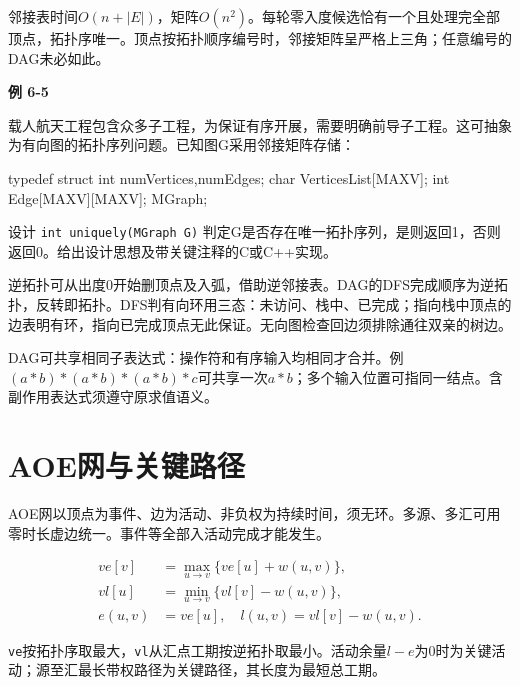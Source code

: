 邻接表时间\(O(n+|E|)\)，矩阵\(O(n^2)\)。每轮零入度候选恰有一个且处理完全部顶点，拓扑序唯一。顶点按拓扑顺序编号时，邻接矩阵呈严格上三角；任意编号的DAG未必如此。

\par\medskip{}\noindent\hypertarget{DS06-E05}{}\label{DS06-E05}\textbf{例 6-5}\par\nobreak\smallskip

载人航天工程包含众多子工程，为保证有序开展，需要明确前导子工程。这可抽象为有向图的拓扑序列问题。已知图G采用邻接矩阵存储：

\par\smallskip\noindent\begin{minipage}{\linewidth}
\begin{codeblock}[language={C}]
typedef struct {
    int numVertices,numEdges;
    char VerticesList[MAXV];
    int Edge[MAXV][MAXV];
} MGraph;
\end{codeblock}
\end{minipage}\par\smallskip

设计 \texttt{int uniquely(\allowbreak{}MGraph G)\allowbreak{}} 判定G是否存在唯一拓扑序列，是则返回1，否则返回0。给出设计思想及带关键注释的C或C++实现。

逆拓扑可从出度0开始删顶点及入弧，借助逆邻接表。DAG的DFS完成顺序为逆拓扑，反转即拓扑。DFS判有向环用三态：未访问、栈中、已完成；指向栈中顶点的边表明有环，指向已完成顶点无此保证。无向图检查回边须排除通往双亲的树边。

DAG可共享相同子表达式：操作符和有序输入均相同才合并。例\((a*b)*(a*b)*(a*b)*c\)可共享一次\(a*b\)；多个输入位置可指同一结点。含副作用表达式须遵守原求值语义。

\section{AOE网与关键路径}\label{DS06-critical}

AOE网以顶点为事件、边为活动、非负权为持续时间，须无环。多源、多汇可用零时长虚边统一。事件等全部入活动完成才能发生。

\[\begin{aligned}
ve[v]&=\max_{u\to v}\{ve[u]+w(u,v)\},\\
vl[u]&=\min_{u\to v}\{vl[v]-w(u,v)\},\\
e(u,v)&=ve[u],\quad l(u,v)=vl[v]-w(u,v).
\end{aligned}\]

\texttt{ve}按拓扑序取最大，\texttt{vl}从汇点工期按逆拓扑取最小。活动余量\(l-e\)为0时为关键活动；源至汇最长带权路径为关键路径，其长度为最短总工期。

